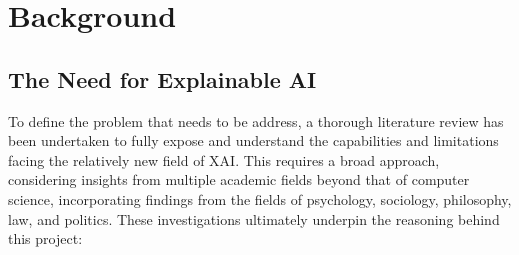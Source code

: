 \chapter{Background} \label{Background}

\section{The Need for Explainable AI}

To define the problem that needs to be address, a thorough literature review has been undertaken to fully expose and understand the capabilities and limitations facing the relatively new field of XAI. This requires a broad approach, considering insights from multiple academic fields beyond that of computer science, incorporating findings from the fields of psychology, sociology, philosophy, law, and politics. These investigations ultimately underpin the reasoning behind this project:

